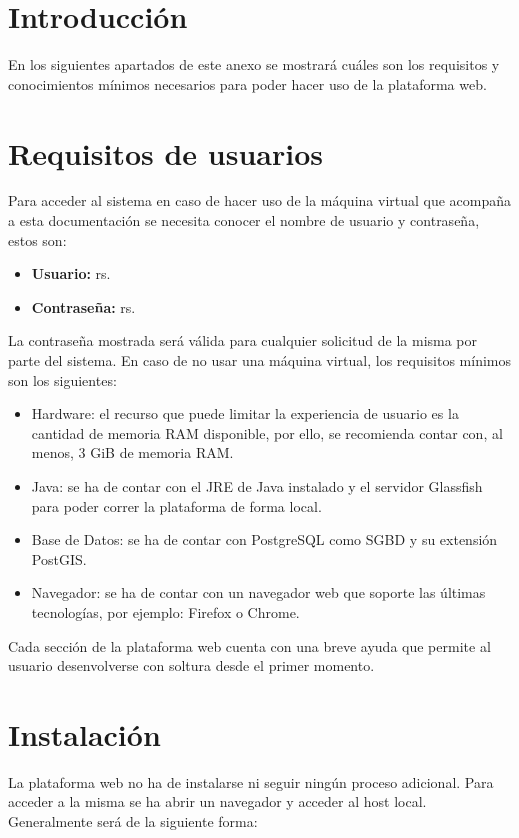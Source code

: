 
\section{Introducción}
En los siguientes apartados de este anexo se mostrará cuáles son los requisitos y conocimientos mínimos necesarios para poder hacer uso de la plataforma web.

\section{Requisitos de usuarios}
Para acceder al sistema en caso de hacer uso de la máquina virtual que acompaña a esta documentación se necesita conocer el nombre de usuario y contraseña, estos son:

\begin{itemize}
	\item \textbf{Usuario:} rs.
	\item \textbf{Contraseña:} rs.
\end{itemize}
La contraseña mostrada será válida para cualquier solicitud de la misma por parte del sistema. En caso de no usar una máquina virtual, los requisitos mínimos son los siguientes:

\begin{itemize}
	\item Hardware: el recurso que puede limitar la experiencia de usuario es la cantidad de memoria RAM disponible, por ello, se recomienda contar con, al menos, 3 GiB de memoria RAM.
	\item Java: se ha de contar con el JRE de Java instalado y el servidor Glassfish para poder correr la plataforma de forma local.
	\item Base de Datos: se ha de contar con PostgreSQL como SGBD y su extensión PostGIS.
	\item Navegador: se ha de contar con un navegador web que soporte las últimas tecnologías, por ejemplo: Firefox o Chrome.
\end{itemize}

Cada sección de la plataforma web cuenta con una breve ayuda que permite al usuario desenvolverse con soltura desde el primer momento.

\section{Instalación}
La plataforma web no ha de instalarse ni seguir ningún proceso adicional. Para acceder a la misma se ha abrir un navegador y acceder al host local. Generalmente será de la siguiente forma:


